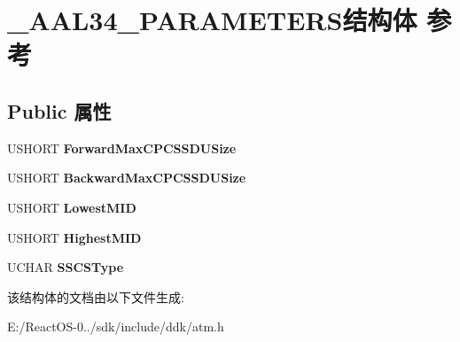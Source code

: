 \hypertarget{struct___a_a_l34___p_a_r_a_m_e_t_e_r_s}{}\section{\+\_\+\+A\+A\+L34\+\_\+\+P\+A\+R\+A\+M\+E\+T\+E\+R\+S结构体 参考}
\label{struct___a_a_l34___p_a_r_a_m_e_t_e_r_s}
\subsection*{Public 属性}
\begin{DoxyCompactItemize}
\item 
\mbox{\label{struct___a_a_l34___p_a_r_a_m_e_t_e_r_s_a26d40f4b0214318eb4b3bffc20a77634}} 
U\+S\+H\+O\+RT {\bfseries Forward\+Max\+C\+P\+C\+S\+S\+D\+U\+Size}
\item 
\mbox{\label{struct___a_a_l34___p_a_r_a_m_e_t_e_r_s_ae81fe2b2a1349cc98101034c475b89cf}} 
U\+S\+H\+O\+RT {\bfseries Backward\+Max\+C\+P\+C\+S\+S\+D\+U\+Size}
\item 
\mbox{\label{struct___a_a_l34___p_a_r_a_m_e_t_e_r_s_a866a2b64742230ff13a12ec892c22789}} 
U\+S\+H\+O\+RT {\bfseries Lowest\+M\+ID}
\item 
\mbox{\label{struct___a_a_l34___p_a_r_a_m_e_t_e_r_s_a0c6852e628cba76c693ccbad68305539}} 
U\+S\+H\+O\+RT {\bfseries Highest\+M\+ID}
\item 
\mbox{\label{struct___a_a_l34___p_a_r_a_m_e_t_e_r_s_a5f353d0a16e6a0adb2d09b01e2186314}} 
U\+C\+H\+AR {\bfseries S\+S\+C\+S\+Type}
\end{DoxyCompactItemize}


该结构体的文档由以下文件生成\+:\begin{DoxyCompactItemize}
\item 
E\+:/\+React\+O\+S-\/0../sdk/include/ddk/atm.\+h\end{DoxyCompactItemize}
